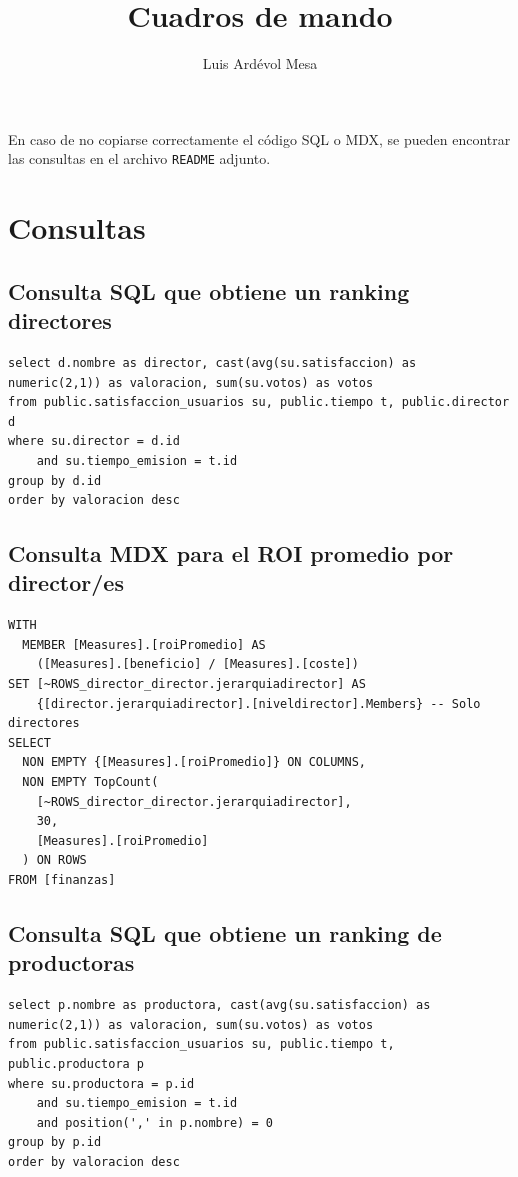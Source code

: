 \documentclass[11pt]{opticajnl}
\title{Cuadros de mando}
\author[1,2,3]{Luis Ardévol Mesa}
\begin{document}
\maketitle

En caso de no copiarse correctamente el código SQL o MDX, se pueden encontrar las consultas en el archivo \texttt{README} adjunto.

 
\section{Consultas}

\subsection{Consulta SQL que obtiene un ranking directores}

\begin{lstlisting}[style=terminal]
select d.nombre as director, cast(avg(su.satisfaccion) as numeric(2,1)) as valoracion, sum(su.votos) as votos
from public.satisfaccion_usuarios su, public.tiempo t, public.director d
where su.director = d.id
	and su.tiempo_emision = t.id
group by d.id
order by valoracion desc
\end{lstlisting}

\subsection{Consulta MDX para el ROI promedio por director/es}

\begin{lstlisting}[style=terminal]
WITH
  MEMBER [Measures].[roiPromedio] AS
    ([Measures].[beneficio] / [Measures].[coste])
SET [~ROWS_director_director.jerarquiadirector] AS
    {[director.jerarquiadirector].[niveldirector].Members} -- Solo directores
SELECT
  NON EMPTY {[Measures].[roiPromedio]} ON COLUMNS,
  NON EMPTY TopCount(
    [~ROWS_director_director.jerarquiadirector], 
    30, 
    [Measures].[roiPromedio]
  ) ON ROWS
FROM [finanzas]
\end{lstlisting}
\newpage
\subsection{Consulta SQL que obtiene un ranking de productoras}

\begin{lstlisting}[style=terminal]
select p.nombre as productora, cast(avg(su.satisfaccion) as numeric(2,1)) as valoracion, sum(su.votos) as votos
from public.satisfaccion_usuarios su, public.tiempo t, public.productora p
where su.productora = p.id
	and su.tiempo_emision = t.id
	and position(',' in p.nombre) = 0
group by p.id
order by valoracion desc
\end{lstlisting}
\end{document}
